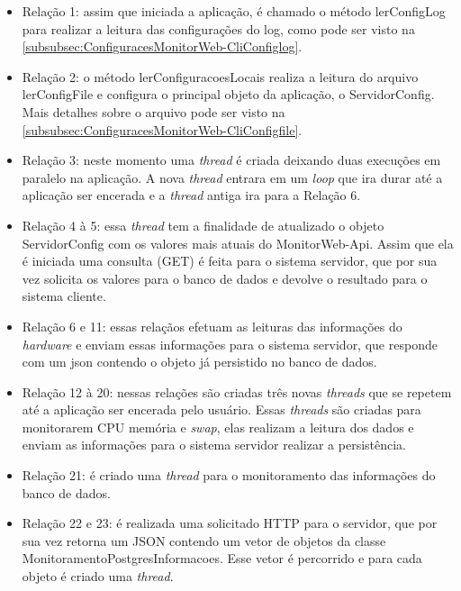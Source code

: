 \begin{itemize}
	\item Relação 1: assim que iniciada a aplicação, é chamado o método lerConfigLog para realizar a leitura das configurações do log, como pode ser visto na \autoref{subsubsec:ConfiguracesMonitorWeb-CliConfiglog}.
	
	\item Relação 2: o método lerConfiguracoesLocais realiza a leitura do arquivo lerConfigFile e configura o principal objeto da aplicação, o ServidorConfig. Mais detalhes sobre o arquivo pode ser visto na \autoref{subsubsec:ConfiguracesMonitorWeb-CliConfigfile}.
	
	\item Relação 3: neste momento uma \textit{thread} é criada deixando duas execuções em paralelo na aplicação. A nova \textit{thread} entrara em um \textit{loop} que ira durar até a aplicação ser encerada e a \textit{thread} antiga ira para a Relação 6.
	
	\item Relação 4 à 5: essa \textit{thread} tem a finalidade de atualizado o objeto ServidorConfig com os valores mais atuais do MonitorWeb-Api. Assim que ela é iniciada uma consulta (GET) é feita para o sistema servidor, que por sua vez solicita os valores para o banco de dados e devolve o resultado para o sistema cliente.
	
	\item Relação 6 e 11: essas relaçãos efetuam as leituras das informações do \textit{hardware} e enviam essas informações para o sistema servidor, que responde com um json contendo o objeto já persistido no banco de dados.
	
	\item Relação 12 à 20: nessas relações são criadas três novas \textit{threads} que se repetem até a aplicação ser encerada pelo usuário. Essas \textit{threads} são criadas para monitorarem CPU memória e \textit{swap}, elas realizam a leitura dos dados e enviam as informações para o sistema servidor realizar a persistência.
	
	\item Relação 21: é criado uma \textit{thread} para o monitoramento das informações do banco de dados.
	
	\item Relação 22 e 23: é realizada uma solicitado HTTP para o servidor, que por sua vez retorna um JSON contendo um vetor de objetos da classe MonitoramentoPostgresInformacoes. Esse vetor é percorrido e para cada objeto é criado uma \textit{thread}.
	

\end{itemize}

